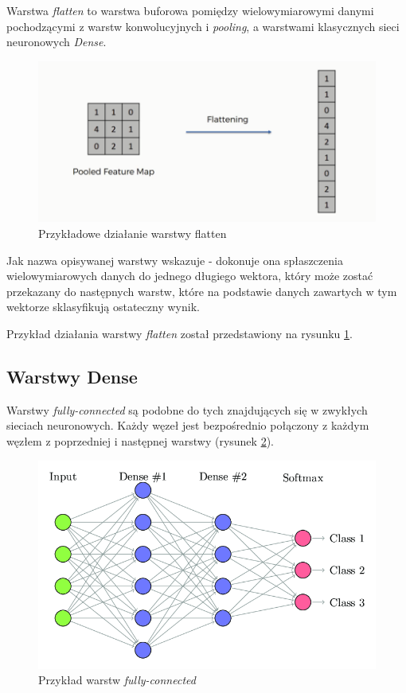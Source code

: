\documentclass[a4paper,12pt,oneside]{book} %
\begin{document}
Warstwa \emph{flatten} to warstwa buforowa pomiędzy wielowymiarowymi danymi pochodzącymi z warstw konwolucyjnych i \emph{pooling}, a warstwami klasycznych sieci neuronowych \emph{Dense}. 
\begin{figure}[h]
	\centering
	\includegraphics[scale=0.6]{flatten.png}
	\caption{Przykładowe działanie warstwy flatten\cite{superddflatten}}
	\label{flatten}
\end{figure}
Jak nazwa opisywanej warstwy wskazuje - dokonuje ona spłaszczenia wielowymiarowych danych do jednego długiego wektora, który może zostać przekazany do następnych warstw, które na podstawie danych zawartych w tym wektorze sklasyfikują ostateczny wynik\cite{superddflatten}.

Przykład działania warstwy \emph{flatten} został przedstawiony na rysunku \ref{flatten}.



\subsection{Warstwy Dense}
\label{dense}
Warstwy \emph{fully-connected} są podobne do tych znajdujących się w zwykłych sieciach neuronowych. Każdy węzeł jest bezpośrednio połączony z każdym węzłem z poprzedniej i następnej warstwy (rysunek \ref{fullycon})\cite{8308186}. 

\begin{figure}[h]
	\centering
	\includegraphics[scale=0.6]{fullycon.png}
	\caption{Przykład warstw \emph{fully-connected}\cite{fullycon}}
	\label{fullycon}
\end{figure}
\end{document}
